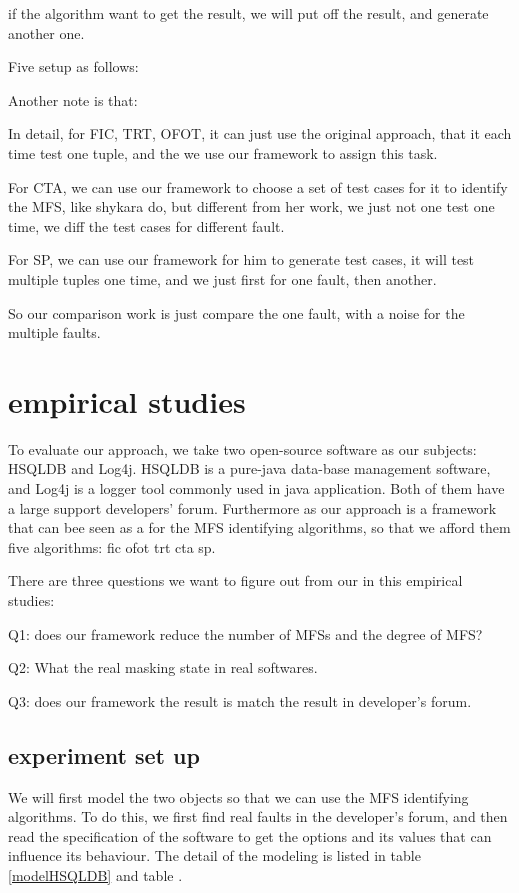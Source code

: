 \documentclass{sig-alternate}
\begin{document}
if the algorithm want to get the result, we will put off the result, and generate another one.

Five setup as follows:

Another note is that:

In detail, for FIC, TRT, OFOT, it can just use the original approach, that it each time test one tuple, and the we use our framework to assign this task.

For CTA, we can use our framework to choose a set of test cases for it to identify the MFS, like shykara do, but different from her work, we just not one test one time, we diff the test cases for different fault.


For SP, we can use our framework for him to generate test cases, it will test multiple tuples one time, and we just first for one fault, then another.

So  our comparison work is just compare the one fault, with a noise for the multiple faults.

\section{empirical studies}
To evaluate our approach, we take two open-source software as our subjects: HSQLDB and Log4j. HSQLDB is a pure-java data-base management software, and Log4j is a logger tool commonly used in java application. Both of them have a large support developers' forum. Furthermore as our approach is a framework that can bee seen as a for the MFS identifying algorithms, so that we afford them five algorithms: fic ofot trt cta sp.

There are three questions we want to figure out from our in this empirical studies:

Q1: does our framework reduce the number of MFSs and the degree of MFS?

Q2: What the real masking state in real softwares.

Q3: does our framework the result is match the result in developer's forum.

\subsection{experiment set up}
We will first model the two objects so that we can use the MFS identifying algorithms. To do this, we first find real faults in the developer's forum, and then read the specification of the software to get the options and its values that can influence its behaviour. The detail of the modeling is listed in table \ref{modelHSQLDB} and table .
\end{document}

